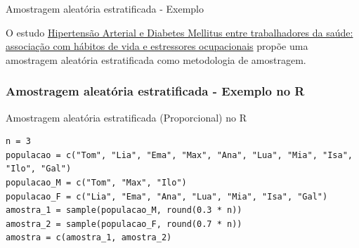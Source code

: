 \begin{frame}{Amostragem aleatória estratificada - Exemplo}
    \begin{exemplo}
    O estudo \href{https://www.scielo.br/j/rbso/a/bMg5nzYYqSBGWCjZrzjhYPb/}{Hipertensão Arterial e Diabetes Mellitus entre trabalhadores da saúde: associação com hábitos de vida
    e estressores ocupacionais} propõe uma amostragem aleatória estratificada como metodologia de amostragem.     
    \end{exemplo}
   
\end{frame}

\begin{frame}[fragile]
\frametitle{Amostragem aleatória estratificada - Exemplo no R}
\begin{block}{Amostragem aleatória estratificada (Proporcional) no R}
\begin{verbatim}
n = 3
populacao = c("Tom", "Lia", "Ema", "Max", "Ana", "Lua", "Mia", "Isa", "Ilo", "Gal")
populacao_M = c("Tom", "Max", "Ilo")
populacao_F = c("Lia", "Ema", "Ana", "Lua", "Mia", "Isa", "Gal")
amostra_1 = sample(populacao_M, round(0.3 * n))
amostra_2 = sample(populacao_F, round(0.7 * n))
amostra = c(amostra_1, amostra_2)
\end{verbatim}
\end{block}
\end{frame}

